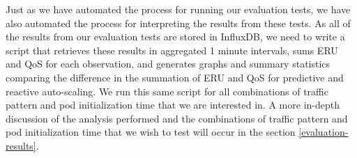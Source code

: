 Just as we have automated the process for running our evaluation tests, we have
also automated the process for interpreting the results from these tests. As all
of the results from our evaluation tests are stored in InfluxDB, we need to
write a script that retrieves these results in aggregated 1 minute intervals,
sums ERU and QoS for each observation, and generates graphs and summary
statistics comparing the difference in the summation of ERU and QoS for
predictive and reactive auto-scaling. We run this same script for all
combinations of traffic pattern and pod initialization time that we are
interested in. A more in-depth discussion of the analysis performed and the
combinations of traffic pattern and pod initialization time that we wish to test
will occur in the section \ref{evaluation-results}.
